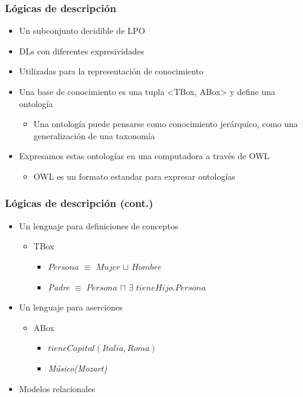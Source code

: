 \documentclass[compress,xcolor=dvipsnames]{beamer}
\theoremstyle{definition}
\begin{document}
\begin{frame}
\frametitle{Lógicas de descripción}
\begin{itemize}[<+->]
	\item Un subconjunto decidible de LPO
	\item DLs con diferentes expresividades
	\item Utilizadas para la representación de conocimiento
	\item Una base de conocimiento es una tupla <TBox, ABox> y define una ontología
		\begin{itemize}[<+->]
			\item Una ontología puede pensarse como conocimiento jerárquico, como una generalización de una taxonomía
		\end{itemize}
	\item Expresamos estas ontologías en una computadora a través de OWL
	\begin{itemize}[<+->]
			\item OWL es un formato estandar para expresar ontologías
		\end{itemize}
\end{itemize}
\end{frame}

\begin{frame}
	\frametitle{Lógicas de descripción (cont.)}
	
	\begin{itemize}[<+->]
		\item Un lenguaje para definiciones de conceptos
		\begin{itemize}[<+->]
			\item TBox
			\begin{itemize}[<+->]
				\item $Persona$ $\equiv$ $Mujer$ $\sqcup$ $Hombre$
				\item \textit{Padre} $\equiv$ $Persona$ $\sqcap$ $\exists$ $tieneHijo.Persona$
			\end{itemize}
		\end{itemize}
		\item Un lenguaje para aserciones
			\begin{itemize}[<+->]
				\item ABox
				\begin{itemize}[<+->]
					\item $tieneCapital(Italia, Roma)$
					\item \textit{Músico(Mozart)}
				\end{itemize}
			\end{itemize}
		\item Modelos relacionales
	\end{itemize}
\end{frame}
\end{document}
